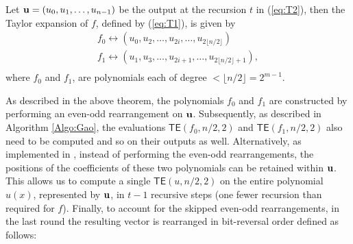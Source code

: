 




\begin{theorem} \label{th:even_odd}
	Let ${\bf{u}}=(u_0, u_1, \ldots, u_{n-1})$ be the output at the  recursion $t$ in (\ref{eq:T2}),  then the Taylor expansion of $f$, defined by (\ref{eq:T1}), is given by  
	\[
	\begin{array}{l}
		f_0 \leftrightarrow (u_0, u_2, \ldots, u_{2i}, \ldots, u_{2\lfloor{n/2\rfloor}})\\
		f_1 \leftrightarrow (u_1, u_3, \ldots, u_{2i+1}, \ldots, u_{2\lfloor{n/2\rfloor}+1}),\\
	\end{array}
	\]
	where $f_0$ and $f_1$, are polynomials each of degree $<\lfloor{n/2\rfloor}=2^{m-1}$.
\end{theorem}

As described in the above theorem, the polynomials $f_0$ and $f_1$ are constructed by performing an even-odd rearrangement on ${\bf{u}}$. Subsequently, as described in Algorithm \ref{Algo:Gao}, the evaluations $\mathsf{TE}(f_0, n/2, 2)$ and $\mathsf{TE}(f_1, n/2, 2)$ also need to be computed and so on their outputs as well. Alternatively, as implemented in \cite{libiop}, instead of performing the even-odd rearrangements, the positions of the coefficients of these two polynomials can be retained within ${\bf{u}}$. This allows us to compute a single $\mathsf{TE}(u, n/2, 2)$ on the entire polynomial $u(x)$, represented by ${\bf{u}}$, in $t-1$ recursive steps (one fewer recursion than required for $f$). Finally, to account for the skipped even-odd rearrangements, in the last round the resulting vector is rearranged in bit-reversal order defined as follows: 

